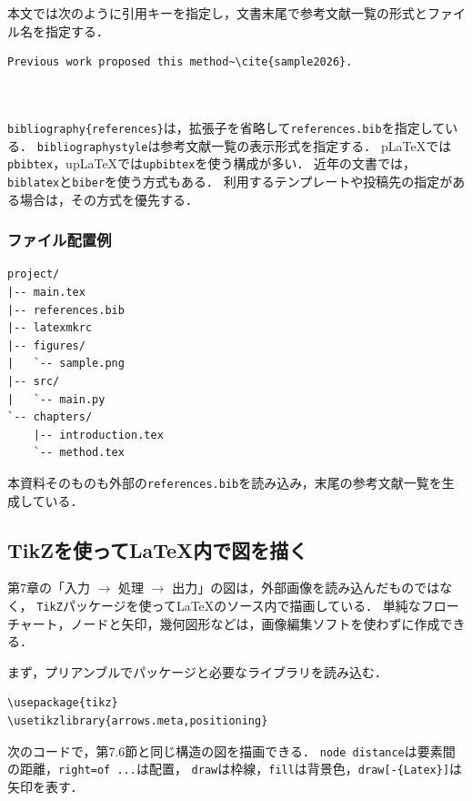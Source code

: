 \documentclass[a4paper,11pt]{jsarticle}
\newcommand{\code}[1]{\texttt{#1}}
\begin{document}
本文では次のように引用キーを指定し，文書末尾で参考文献一覧の形式とファイル名を指定する．

\begin{lstlisting}[language={[LaTeX]TeX}]
Previous work proposed this method~\cite{sample2026}.



\end{lstlisting}

\clearpage
\code{bibliography\{references\}}は，拡張子を省略して\code{references.bib}を指定している．
\code{bibliographystyle}は参考文献一覧の表示形式を指定する．
pLaTeXでは\code{pbibtex}，upLaTeXでは\code{upbibtex}を使う構成が多い．
近年の文書では，\code{biblatex}と\code{biber}を使う方式もある．
利用するテンプレートや投稿先の指定がある場合は，その方式を優先する．

\subsubsection{ファイル配置例}

\begin{lstlisting}
project/
|-- main.tex
|-- references.bib
|-- latexmkrc
|-- figures/
|   `-- sample.png
|-- src/
|   `-- main.py
`-- chapters/
    |-- introduction.tex
    `-- method.tex
\end{lstlisting}

本資料そのものも外部の\code{references.bib}を読み込み，末尾の参考文献一覧を生成している．

\subsection{TikZを使ってLaTeX内で図を描く}

第7章の「入力 $\rightarrow$ 処理 $\rightarrow$ 出力」の図は，外部画像を読み込んだものではなく，
\code{TikZ}パッケージを使ってLaTeXのソース内で描画している．
単純なフローチャート，ノードと矢印，幾何図形などは，画像編集ソフトを使わずに作成できる．

まず，プリアンブルでパッケージと必要なライブラリを読み込む．

\begin{lstlisting}[language={[LaTeX]TeX}]
\usepackage{tikz}
\usetikzlibrary{arrows.meta,positioning}
\end{lstlisting}

次のコードで，第7.6節と同じ構造の図を描画できる．
\code{node distance}は要素間の距離，\code{right=of ...}は配置，
\code{draw}は枠線，\code{fill}は背景色，\code{draw[-\{Latex\}]}は矢印を表す．
\end{document}
